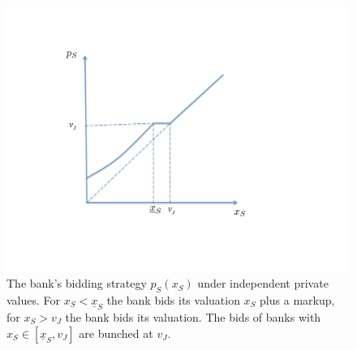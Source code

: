 \documentclass[11pt,twopage]{article}
\newcommand{\AN}[1]{\textcolor{red}{[AN: #1]}}
\newcommand{\AS}[1]{\textcolor{blue}{[AS: #1]}}
\newcommand{\PX}[1]{\textcolor{green}{[PX: #1]}}
\newcommand{\ul}{\underline}
\begin{document}
%
\begin{figure}[t]
  \centering
  \includegraphics[scale=0.55]{graphics/equilibrium.pdf}
  \caption{The bank's bidding strategy $p_S(x_S)$ under independent private values. For $x_S<\ul x_S$ the bank bids its valuation $x_S$ plus a markup, for $x_S>v_J$ the bank bids its valuation. The bids of banks with $x_S\in [\ul x_S,v_J]$ are bunched at $v_J$.\label{fig:equilibrium}}
\end{figure}

\end{document}
